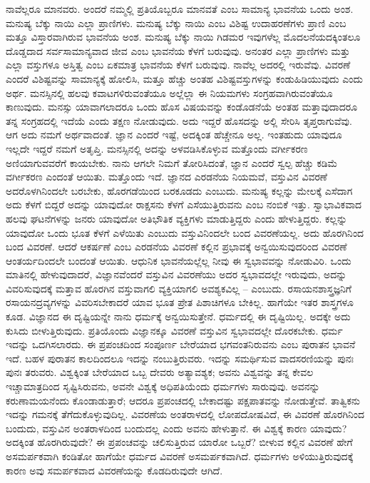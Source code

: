 ನಾವೆಲ್ಲರೂ ಮಾನವರು. ಅಂದರೆ ನಮ್ಮಲ್ಲಿ ಪ್ರತಿಯೊಬ್ಬರೂ ಮಾನವತೆ ಎಂಬ ಸಾಮಾನ್ಯ ಭಾವನೆಯ ಒಂದು ಅಂಶ. ಮನುಷ್ಯ ಬೆಕ್ಕು ನಾಯಿ ಎಲ್ಲಾ ಪ್ರಾಣಿಗಳು. ಮನುಷ್ಯ ಬೆಕ್ಕು ನಾಯಿ ಎಂಬ ವಿಶಿಷ್ಟ ಉದಾಹರಣೆಗಳು ಪ್ರಾಣಿ ಎಂಬ ಮತ್ತೂ ವಿಸ್ತಾರವಾಗಿರುವ ಭಾವನೆಯ ಅಂಶ. ಮನುಷ್ಯ ಬೆಕ್ಕು ನಾಯಿ ಗಿಡಮರ ಇವುಗಳೆಲ್ಲ ಮೊದಲನೆಯದಕ್ಕಿಂತಲೂ ದೊಡ್ಡದಾದ ಸರ್ವಸಾಮಾನ್ಯವಾದ ಜೀವ ಎಂಬ ಭಾವನೆಯ ಕೆಳಗೆ ಬರುವುವು. ಅನಂತರ ಎಲ್ಲಾ ಪ್ರಾಣಿಗಳು ಮತ್ತು ಎಲ್ಲಾ ವಸ್ತುಗಳೂ ಅಸ್ತಿತ್ವ ಎಂಬ ಏಕಮಾತ್ರ ಭಾವನೆಯ ಕೆಳಗೆ ಬರುವುವು. ನಾವೆಲ್ಲ ಅದರಲ್ಲಿ ಇರುವೆವು. ವಿವರಣೆ ಎಂದರೆ ವಿಶಿಷ್ಟವನ್ನು ಸಾಮಾನ್ಯಕ್ಕೆ ಹೋಲಿಸಿ, ಮತ್ತೂ ಹೆಚ್ಚು ಅಂತಹ ವಿಶಿಷ್ಟ\break ವಸ್ತುಗಳನ್ನು ಕಂಡುಹಿಡಿಯುವುದು ಎಂದು ಅರ್ಥ. ಮನಸ್ಸಿನಲ್ಲಿ ಹಲವು ಕವಾಟಗಳಿರುವಂತೆಯೂ ಅಲ್ಲೆಲ್ಲಾ ಈ ನಿಯಮಗಳು ಸಂಗ್ರಹವಾಗಿರುವಂತೆಯೂ ಕಾಣುವುದು. ಮನಸ್ಸು ಯಾವಾಗಲಾದರೂ ಒಂದು ಹೊಸ ವಿಷಯವನ್ನು ಕಂಡೊಡನೆಯೆ ಅಂತಹ ಮತ್ತಾವುದಾದರೂ ತನ್ನ ಸಂಗ್ರಹದಲ್ಲಿ ಇದೆಯೆ ಎಂದು ತಕ್ಷಣ ನೋಡುವುದು. ಅದು ಇದ್ದರೆ ಹೊಸದನ್ನು ಅಲ್ಲಿ ಸೇರಿಸಿ ತೃಪ್ತರಾಗುವೆವು. ಆಗ ಅದು ನಮಗೆ ಅರ್ಥವಾದಂತೆ. ಜ್ಞಾನ ಎಂದರೆ ಇಷ್ಟೆ, ಅದಕ್ಕಿಂತ ಹೆಚ್ಚೇನೂ ಅಲ್ಲ. ಇಂತಹುದು ಯಾವುದೂ ಇಲ್ಲದೇ ಇದ್ದರೆ ನಮಗೆ ಅತೃಪ್ತಿ. ಮನಸ್ಸಿನಲ್ಲಿ ಅದನ್ನು ಅಳವಡಿಸಿಕೊಳ್ಳುವ ಮತ್ತೊಂದು ವರ್ಗೀಕರಣ ಅಣಿಯಾಗುವವರೆಗೆ ಕಾಯಬೇಕು. ನಾನು ಆಗಲೇ ನಿಮಗೆ ತೋರಿಸಿದಂತೆ, ಜ್ಞಾನ ಎಂದರೆ ಸ್ವಲ್ಪ ಹೆಚ್ಚು ಕಡಿಮೆ ವರ್ಗೀಕರಣ ಎಂದಂತೆ ಆಯಿತು. ಮತ್ತೊಂದು ಇದೆ. ಜ್ಞಾನದ ಎರಡನೆಯ ನಿಯಮವೆ, ವಸ್ತುವಿನ ವಿವರಣೆ ಅದರೊಳಗಿನಿಂದಲೇ ಬರಬೇಕು, ಹೊರಗಡೆಯಿಂದ ಬರಕೂಡದು ಎಂಬುದು. ಮನುಷ್ಯ ಕಲ್ಲನ್ನು ಮೇಲಕ್ಕೆ ಎಸೆದಾಗ ಅದು ಕೆಳಗೆ ಬಿದ್ದರೆ ಅದನ್ನು ಯಾವುದೋ ರಾಕ್ಷಸನು ಕೆಳಗೆ ಎಸೆಯುತ್ತಿರುವನು ಎಂಬ ನಂಬಿಕೆ ಇತ್ತು. ಸ್ವಾಭಾವಿಕವಾದ ಹಲವು ಘಟನೆಗಳನ್ನು ಜನರು ಯಾವುದೋ ಅತಿಭೌತಿಕ ವ್ಯಕ್ತಿಗಳು ಮಾಡುತ್ತಿದ್ದರು ಎಂದು ಹೇಳುತ್ತಿದ್ದರು. ಕಲ್ಲನ್ನು ಯಾವುದೋ ಒಂದು ಭೂತ ಕೆಳಗೆ ಎಳೆಯಿತು ಎಂಬುದು ವಸ್ತುವಿನಿಂದಲೇ ಬಂದ ವಿವರಣೆಯಲ್ಲ. ಅದು ಹೊರಗಿನಿಂದ ಬಂದ ವಿವರಣೆ. ಆದರೆ ಆಕರ್ಷಣೆ ಎಂಬ ಎರಡನೆಯ ವಿವರಣೆ ಕಲ್ಲಿನ ಪ್ರಭಾವಕ್ಕೆ ಅನ್ವಯಿಸುವುದರಿಂದ ವಿವರಣೆ ಆಂತರ್ಯದಿಂದಲೇ ಬಂದಂತೆ ಆಯಿತು. ಆಧುನಿಕ ಭಾವನೆಯಲ್ಲೆಲ್ಲ ನೀವು ಈ ಸ್ವಭಾವವನ್ನು ನೋಡುವಿರಿ. ಒಂದು ಮಾತಿನಲ್ಲಿ ಹೇಳುವುದಾದರೆ, ವಿಜ್ಞಾನವೆಂದರೆ ವಸ್ತುವಿನ ವಿವರಣೆಯು ಅದರ ಸ್ವಭಾವದಲ್ಲೇ ಇರುವುದು, ಅದನ್ನು ವಿವರಿಸುವುದಕ್ಕೆ ಮತ್ತಾವ ಹೊರಗಿನ ವಸ್ತುವಾಗಲಿ ವ್ಯಕ್ತಿಯಾಗಲಿ ಅವಶ್ಯಕವಿಲ್ಲ – ಎಂಬುದು. ರಸಾಯನಶಾಸ್ತ್ರಜ್ಞನಿಗೆ ರಸಾಯನದ್ರವ್ಯಗಳನ್ನು ವಿವರಿಸಬೇಕಾದರೆ ಯಾವ ಭೂತ ಪ್ರೇತ ಪಿಶಾಚಿಗಳೂ ಬೇಕಿಲ್ಲ. ಹಾಗೆಯೇ ಇತರ ಶಾಸ್ತ್ರಗಳೂ ಕೂಡ. ವಿಜ್ಞಾನದ ಈ ದೃಷ್ಟಿಯನ್ನೇ ನಾನು ಧರ್ಮಕ್ಕೆ ಅನ್ವಯಿಸುತ್ತೇನೆ. ಧರ್ಮದಲ್ಲಿ ಈ ದೃಷ್ಟಿಯಿಲ್ಲ. ಅದಕ್ಕೇ ಅದು ಕುಸಿದು ಬೀಳುತ್ತಿರುವುದು. ಪ್ರತಿಯೊಂದು ವಿಜ್ಞಾನಕ್ಕೂ ವಿವರಣೆ ವಸ್ತುವಿನ ಸ್ವಭಾವದಲ್ಲೇ ದೊರಕಬೇಕು. ಧರ್ಮ ಇದನ್ನು ಒದಗಿಸಲಾರದು. ಈ ಪ್ರಪಂಚದಿಂದ ಸಂಪೂರ್ಣ ಬೇರೆಯಾದ ಭಗವಂತನಿರುವನು ಎಂಬ ಪುರಾತನ ಭಾವನೆ ಇದೆ. ಬಹಳ ಪುರಾತನ ಕಾಲದಿಂದಲೂ ಇದನ್ನು ನಂಬುತ್ತಿರುವರು. ಇದನ್ನು ಸಮರ್ಥಿಸುವ ವಾದಸರಣಿಯನ್ನು ಪುನಃ ಪುನಃ ತರುವರು. ವಿಶ್ವಕ್ಕಿಂತ ಬೇರೆಯಾದ ಒಬ್ಬ ದೇವರು ಅತ್ಯಾವಶ್ಯಕ; ಅವನು ವಿಶ್ವವನ್ನು ತನ್ನ ಕೇವಲ ಇಚ್ಚಾಮಾತ್ರದಿಂದ ಸೃಷ್ಟಿಸಿರುವನು, ಅವನೇ ವಿಶ್ವಕ್ಕೆ ಅಧಿಪತಿಯೆಂದು ಧರ್ಮಗಳು ಸಾರುವುವು. ಅವನನ್ನು ಕರುಣಾಮಯನೆಂದು ಕೊಂಡಾಡುತ್ತಾರೆ; ಆದರೂ ಪ್ರಪಂಚದಲ್ಲಿ ಬೇಕಾದಷ್ಟು ಪಕ್ಷಪಾತವನ್ನು ನೋಡುತ್ತೇವೆ. ತಾತ್ವಿಕನು ಇದನ್ನು ಗಮನಕ್ಕೆ ತೆಗೆದುಕೊಳ್ಳುವುದಿಲ್ಲ. ವಿವರಣೆಯ ಅಂತರಾಳದಲ್ಲಿ ಲೋಪದೋಷವಿದೆ, ಈ ವಿವರಣೆ ಹೊರಗಿನಿಂದ ಬಂದುದು, ವಸ್ತುವಿನ ಅಂತರಾಳದಿಂದ ಬಂದುದಲ್ಲ ಎಂದು ಅವನು ಹೇಳುತ್ತಾನೆ. ಈ ವಿಶ್ವಕ್ಕೆ ಕಾರಣ ಯಾವುದು? ಅದಕ್ಕಿಂತ ಹೊರಗಿರುವುದೇ? ಈ ಪ್ರಪಂಚವನ್ನು ಚಲಿಸುತ್ತಿರುವ ಯಾರೋ ಒಬ್ಬರೆ? ಬೀಳುವ ಕಲ್ಲಿನ ವಿವರಣೆ ಹೇಗೆ ಅಸಮರ್ಪಕವಾಗಿ ಕಂಡಿತೋ ಹಾಗೆಯೇ ಧರ್ಮದ ವಿವರಣೆ ಅಸಮರ್ಪಕವಾಗಿದೆ. ಧರ್ಮಗಳು ಅಳಿಯುತ್ತಿರುವುದಕ್ಕೆ ಕಾರಣ ಅವು ಸಮರ್ಪಕವಾದ ವಿವರಣೆಯನ್ನು ಕೊಡದಿರುವುದೇ ಆಗಿದೆ.

